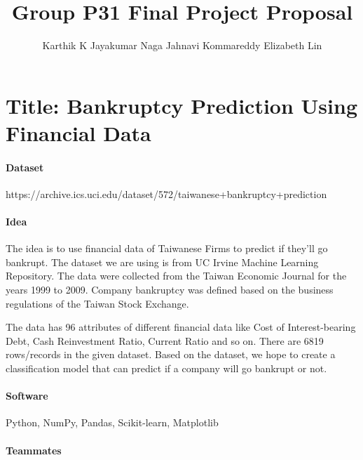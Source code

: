 \documentclass{article}
\title{Group P31 Final Project Proposal}
\author{%
  Karthik K Jayakumar \And
  Naga Jahnavi Kommareddy \And
  Elizabeth Lin
}
\begin{document}
\maketitle


\section{Title: Bankruptcy Prediction Using Financial Data}


\paragraph{Dataset}
https://archive.ics.uci.edu/dataset/572/taiwanese+bankruptcy+prediction


\paragraph{Idea}
The idea is to use financial data of Taiwanese Firms to predict if they’ll go bankrupt. The dataset we are using is from UC Irvine Machine Learning Repository. The data were collected from the Taiwan Economic Journal for the years 1999 to 2009. Company bankruptcy was defined based on the business regulations of the Taiwan Stock Exchange.

The data has 96 attributes of different financial data like Cost of Interest-bearing Debt, Cash Reinvestment Ratio, Current Ratio and so on. There are 6819 rows/records in the given dataset. Based on the dataset, we hope to create a classification model that can predict if a company will go bankrupt or not.

\paragraph{Software}
Python, NumPy, Pandas, Scikit-learn, Matplotlib


\paragraph{Teammates}
\end{document}
